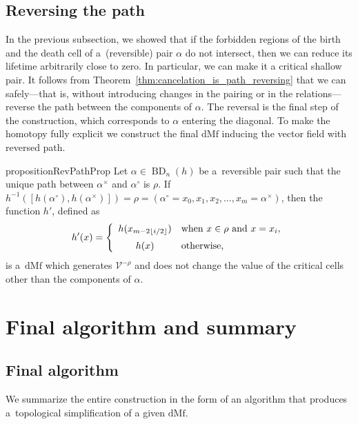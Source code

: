 \documentclass[a4paper,12pt, USenglish,cleveref,autoref,thm-restate]{article}
\newcommand{\mf}{h}
\newcommand{\omf}{h'}
\DeclareMathOperator{\bd}{BD}
\newcommand{\dmf}{\text{dMf}}
\newcommand{\bth}[1]{#1^\circ}
\newcommand{\dth}[1]{#1^{\!\times}}
\newcommand{\bds}{\alpha}
\newcommand{\cV}{\mathcal{V}}
\begin{document}
\subsection{Reversing the path}\label{sec:reversing_the_path}

In the previous subsection, we showed that if the forbidden regions of the birth and the death cell of a~(reversible) pair $\bds$ do not intersect, then we can reduce its lifetime arbitrarily close to zero. 
In particular, we can make it a critical shallow pair. It follows from Theorem~\ref{thm:cancelation_is_path_reversing} that we can safely---that is, without introducing changes in the pairing or in the relations---reverse the path between the components of $\bds$. 
The reversal is the final step of the construction, which corresponds to $\alpha$ entering the diagonal.
To make the homotopy fully explicit we construct the final $\dmf$ inducing the vector field with reversed path. 


\begin{restatable}{proposition}{RevPathProp}\label{prop:reversing_path}
        Let $\bds \in \bd_{n}(\mf)$ be a~reversible pair such that the unique path between $\dth\bds$ and $\bth\bds$ is $\rho$. If $\mf^{-1}([\mf(\bth\bds),\mf(\dth\bds)]) = \rho = (\bth\bds = x_0, x_1, x_2, \ldots , x_m = \dth\bds)$, then the function $\omf$, defined as
%
    \[
\omf(x)=
\left\{
\begin{array}{c@{\quad}l}
 \mf(x_{m - 2 \lfloor i/2 \rfloor})& \text{when } x \in \rho \text{ and } x = x_i,\\[6pt]
h(x) & \text{otherwise,}
\end{array}
\right.
\]
%
is a~$\dmf$ which generates $\cV^{-\rho}$ and does not change the value of the critical cells other than the components of $\bds$.
\end{restatable}


\section{Final algorithm and summary}\label{sec:algorithm}

\subsection{Final algorithm}

We summarize the entire construction in the form of an algorithm that produces a~topological simplification of a given $\dmf$.
\vspace{1ex}
\end{document}
